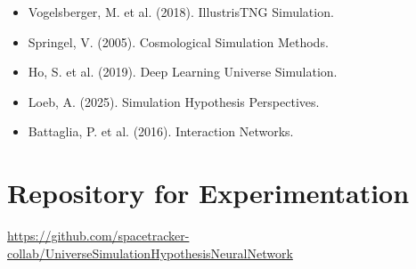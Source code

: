 \documentclass[12pt]{article}
\begin{document}
\begin{itemize}
\item Vogelsberger, M. et al. (2018). IllustrisTNG Simulation.
\item Springel, V. (2005). Cosmological Simulation Methods.
\item Ho, S. et al. (2019). Deep Learning Universe Simulation.
\item Loeb, A. (2025). Simulation Hypothesis Perspectives.
\item Battaglia, P. et al. (2016). Interaction Networks.
\end{itemize}

\section{Repository for Experimentation}

\noindent
\url{https://github.com/spacetracker-collab/UniverseSimulationHypothesisNeuralNetwork}
\end{document}
